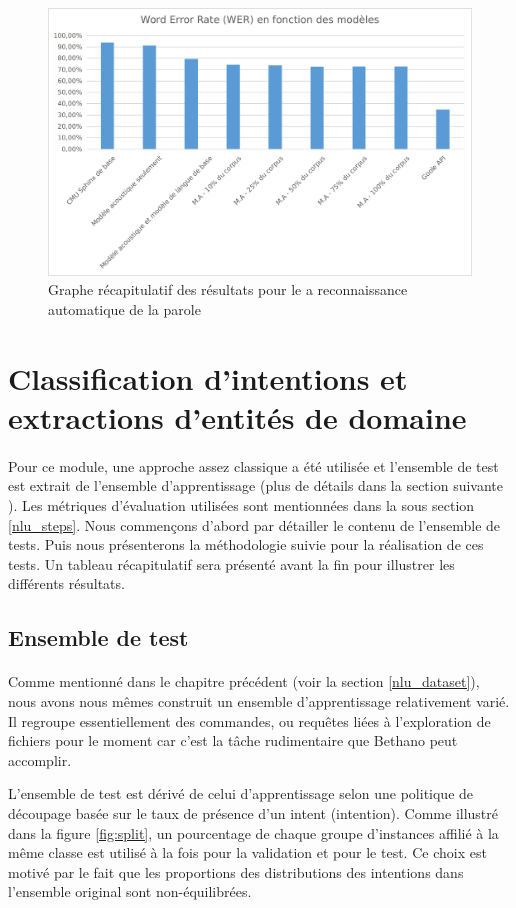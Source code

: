 	\begin{figure}[H]
		\centering
		\includegraphics[width=.9\linewidth]{images/implementation/asr_graph.png} 
		\caption{Graphe récapitulatif des résultats pour le a reconnaissance automatique de la parole}
		\label{fig:asr_results}
	\end{figure}
\section{Classification d'intentions et extractions d'entités de domaine}
\paragraph{}
Pour ce module, une approche assez classique a été utilisée et l'ensemble de test est extrait de l'ensemble d'apprentissage (plus de détails dans la section suivante ). Les métriques d'évaluation utilisées sont mentionnées dans la sous section \ref{nlu_steps}. Nous commençons d'abord par détailler le contenu de l'ensemble de tests. Puis nous présenterons la méthodologie suivie pour la réalisation de ces tests. Un tableau récapitulatif sera présenté avant la fin pour illustrer les différents résultats.
	\subsection{Ensemble de test}
	\paragraph{}
	Comme mentionné dans le chapitre précédent (voir la section \ref{nlu_dataset}), nous avons nous mêmes construit un ensemble d'apprentissage relativement varié. Il regroupe essentiellement des commandes, ou requêtes liées à l'exploration de fichiers pour le moment car c'est la tâche rudimentaire que Bethano peut accomplir.
	\par
	L'ensemble de test est dérivé de celui d'apprentissage selon une politique de découpage basée sur le taux de présence d'un intent (intention). Comme illustré dans la figure \ref{fig:split}, un pourcentage de chaque groupe d'instances affilié à la même classe est utilisé à la fois pour la validation et pour le test. Ce choix est motivé par le fait que les proportions des distributions des intentions dans l'ensemble original sont non-équilibrées.
	
